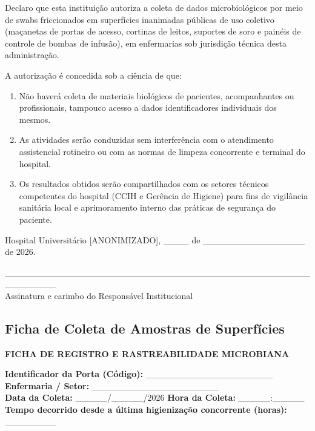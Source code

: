 \documentclass[12pt,a4paper]{article}
\begin{document}
Declaro que esta instituição autoriza a coleta de dados microbiológicos por meio de swabs friccionados em superfícies inanimadas públicas de uso coletivo (maçanetas de portas de acesso, cortinas de leitos, suportes de soro e painéis de controle de bombas de infusão), em enfermarias sob jurisdição técnica desta administração.

A autorização é concedida sob a ciência de que:
\begin{enumerate}
    \item Não haverá coleta de materiais biológicos de pacientes, acompanhantes ou profissionais, tampouco acesso a dados identificadores individuais dos mesmos.
    \item As atividades serão conduzidas sem interferência com o atendimento assistencial rotineiro ou com as normas de limpeza concorrente e terminal do hospital.
    \item Os resultados obtidos serão compartilhados com os setores técnicos competentes do hospital (CCIH e Gerência de Higiene) para fins de vigilância sanitária local e aprimoramento interno das práticas de segurança do paciente.
\end{enumerate}

\vspace{1cm}
\noindent Hospital Universitário [ANONIMIZADO], \_\_\_\_ de \_\_\_\_\_\_\_\_\_\_\_\_\_\_\_\_ de 2026.

\vspace{1.5cm}
\begin{center}
    ________________________________________________________\\
    Assinatura e carimbo do Responsável Institucional
\end{center}

\newpage
\subsection{Ficha de Coleta de Amostras de Superfícies}

\begin{center}
    \textbf{FICHA DE REGISTRO E RASTREABILIDADE MICROBIANA}
\end{center}

\noindent \textbf{Identificador da Porta (Código):} \_\_\_\_\_\_\_\_\_\_\_\_\_\_\_\_\_\_\_\_ \hfill \textbf{Enfermaria / Setor:} \_\_\_\_\_\_\_\_\_\_\_\_\_\_\_\_\_\_\_\_ \\
\textbf{Data da Coleta:} \_\_\_\_\_/\_\_\_\_\_/2026 \hfill \textbf{Hora da Coleta:} \_\_\_\_\_:\_\_\_\_\_ \\
\textbf{Tempo decorrido desde a última higienização concorrente (horas):} \_\_\_\_\_\_\_\_
\end{document}
